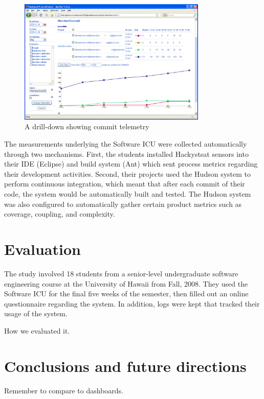 \documentclass{acm_proc_article-sp}
\begin{document}
\begin{figure}[ht]
  \center
  \includegraphics[width=0.8\textwidth]{telemetry-screen.eps}
  \caption{A drill-down showing commit telemetry}
  \label{fig:telemetry}
\end{figure} 

The measurements underlying the Software ICU were collected automatically
through two mechanisms. First, the students installed Hackystsat sensors
into their IDE (Eclipse) and build system (Ant) which sent process
metrics regarding their development activities.  Second, their projects
used the Hudson system to perform continuous integration, which meant that
after each commit of their code, the system would be automatically built
and tested.  The Hudson system was also configured to automatically gather
certain product metrics such as coverage, coupling, and complexity.


\section{Evaluation}
\label{sec:evaluation}

The study involved 18 students from a senior-level undergraduate software
engineering course at the University of Hawaii from Fall, 2008.  They used
the Software ICU for the final five weeks of the semester, then filled out
an online questionnaire regarding the system.  In addition, logs were kept
that tracked their usage of the system.


How we evaluated it.

\section{Conclusions and future directions}
\label{sec:conclusions}

Remember to compare to dashboards. 
\end{document}
